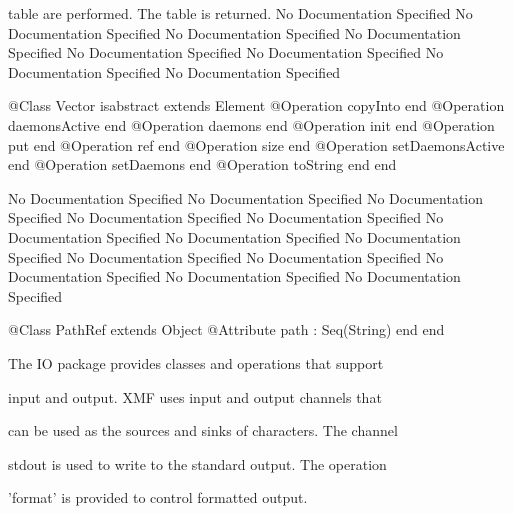      table are performed. The table is returned.
No Documentation Specified
No Documentation Specified
No Documentation Specified
No Documentation Specified
No Documentation Specified
No Documentation Specified
No Documentation Specified
No Documentation Specified
\begin{Interface}
@Class Vector isabstract extends Element
  @Operation copyInto end
  @Operation daemonsActive end
  @Operation daemons end
  @Operation init end
  @Operation put end
  @Operation ref end
  @Operation size end
  @Operation setDaemonsActive end
  @Operation setDaemons end
  @Operation toString end
end
\end{Interface}
No Documentation Specified
No Documentation Specified
No Documentation Specified
No Documentation Specified
No Documentation Specified
No Documentation Specified
No Documentation Specified
No Documentation Specified
No Documentation Specified
No Documentation Specified
No Documentation Specified
No Documentation Specified
No Documentation Specified
\begin{Interface}
@Class PathRef extends Object
  @Attribute path : Seq(String) end
end
\end{Interface}

      The IO package provides classes and operations that support

      input and output. XMF uses input and output channels that

      can be used as the sources and sinks of characters. The channel

      stdout is used to write to the standard output. The operation

      'format' is provided to control formatted output.

